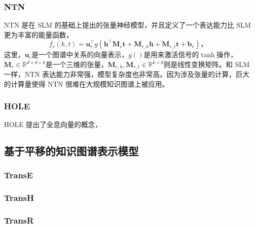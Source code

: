       \subsubsection{NTN}
      NTN \cite{socher2013reasoning} 是在 SLM 的基础上提出的张量神经模型，并且定义了一个表达能力比 SLM 更为丰富的能量函数，
      \begin{equation}
        f_{r}(h, t) = \mathbf{u}_r^\top g (\mathbf{h}^{\top} \mathbf{M}_r \mathbf{t} + \mathbf{M}_{r, h} \mathbf{h} + \mathbf{M}_{r, t}\mathbf{t} + \mathbf{b}_r)，
      \end{equation}
      这里，$\mathbf{u}_r$是一个图谱中关系的向量表示，$g()$是用来激活信号的$\tanh$操作，$\mathbf{M}_r \in \mathbb{R}^{d \times d \times k}$是一个三维的张量，$\mathbf{M}_{r, h}, \mathbf{M}_{r, t} \in  \mathbb{R}^{k\times d}$则是线性变换矩阵。和 SLM 一样，NTN 表达能力非常强，模型复杂度也非常高。因为涉及张量的计算，巨大的计算量使得 NTN 很难在大规模知识图谱上被应用。
      
      \subsubsection{HOLE}

      HOLE \cite{nickel2016holographic} 提出了全息向量的概念，


    \subsection{基于平移的知识图谱表示模型}

      \subsubsection{TransE}
      \subsubsection{TransH}
      \subsubsection{TransR}
